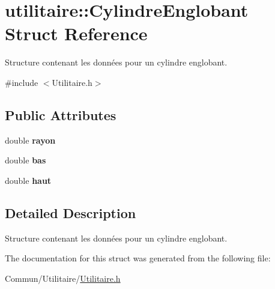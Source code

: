 \hypertarget{structutilitaire_1_1_cylindre_englobant}{}\section{utilitaire\+:\+:Cylindre\+Englobant Struct Reference}
\label{structutilitaire_1_1_cylindre_englobant}


Structure contenant les données pour un cylindre englobant.  




{\ttfamily \#include $<$Utilitaire.\+h$>$}

\subsection*{Public Attributes}
\begin{DoxyCompactItemize}
\item 
\hypertarget{structutilitaire_1_1_cylindre_englobant_abbec6b7a8f2790f286317ffcdeab476c}{}double {\bfseries rayon}\label{structutilitaire_1_1_cylindre_englobant_abbec6b7a8f2790f286317ffcdeab476c}

\item 
\hypertarget{structutilitaire_1_1_cylindre_englobant_ac99c3cebbc6829ad9f54e392f4525e7e}{}double {\bfseries bas}\label{structutilitaire_1_1_cylindre_englobant_ac99c3cebbc6829ad9f54e392f4525e7e}

\item 
\hypertarget{structutilitaire_1_1_cylindre_englobant_a9f86204ad37c5b04fb329b710304c459}{}double {\bfseries haut}\label{structutilitaire_1_1_cylindre_englobant_a9f86204ad37c5b04fb329b710304c459}

\end{DoxyCompactItemize}


\subsection{Detailed Description}
Structure contenant les données pour un cylindre englobant. 

The documentation for this struct was generated from the following file\+:\begin{DoxyCompactItemize}
\item 
Commun/\+Utilitaire/\hyperlink{_utilitaire_8h}{Utilitaire.\+h}\end{DoxyCompactItemize}
